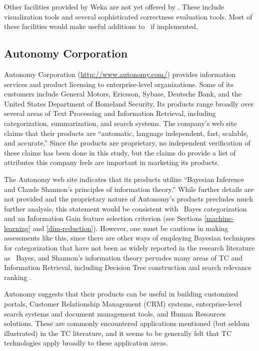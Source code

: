 Other facilities provided by Weka are not yet offered by
\aicat.  These include visualization tools and several
sophisticated correctness evaluation tools.  Most of these
facilities would make useful additions to \aicat\ if
implemented.

\subsection{Autonomy Corporation}

Autonomy Corporation (\url{http://www.autonomy.com/}) provides
information services and product licensing to enterprise-level
organizations.  Some of its customers include General Motors,
Ericsson, Sybase, Deutsche Bank, and the United States Department of
Homeland Security.  Its products range broadly over several areas of
Text Processing and Information Retrieval, including categorization,
summarization, and search systems.  The company's web site claims that
their products are ``automatic, language independent, fast, scalable,
and accurate.''  Since the products are proprietary, no independent
verification of these claims has been done in this study, but the
claims do provide a list of attributes this company feels are
important in marketing its products.

The Autonomy web site indicates that its products utilize ``Bayesian
Inference and Claude Shannon's principles of information theory.''
While further details are not provided and the proprietary nature of
Autonomy's products precludes much further analysis, this statement
would be
consistent with \naive\ Bayes categorization and an Information Gain
feature selection criterion (see Sections \ref{machine-learning} and
\ref{dim-reduction}).  However, one must be cautious in making
assessments like this, since there are other ways of employing
Bayesian techniques for categorization that have not been as widely
reported in the research literature as \naive\ Bayes, and Shannon's
information theory pervades many areas of TC and Information
Retrieval, including Decision Tree construction
\cite{quinlan:89,wallace:93} and search relevance ranking
\cite{greiff:00}.

Autonomy suggests that their products can be useful in building
customized portals, Customer Relationship Management (CRM) systems,
enterprise-level search systems and document management tools, and
Human Resources solutions.  These are commonly encountered
applications mentioned (but seldom illustrated) in the TC literature,
and it seems to be generally felt that TC technologies apply broadly
to these application areas.

